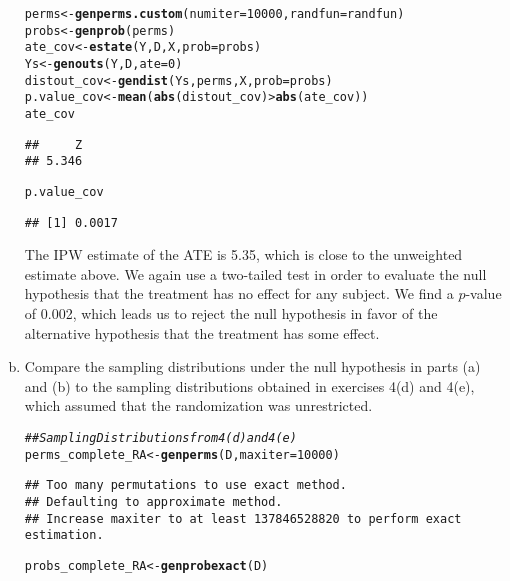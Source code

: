 \documentclass[11pt,notitlepage]{article}\usepackage[]{graphicx}\usepackage[]{color}
\makeatletter
\newcommand{\hlnum}[1]{\textcolor[rgb]{0.686,0.059,0.569}{#1}}%
\newcommand{\hlcom}[1]{\textcolor[rgb]{0.678,0.584,0.686}{\textit{#1}}}%
\newcommand{\hlopt}[1]{\textcolor[rgb]{0,0,0}{#1}}%
\newcommand{\hlstd}[1]{\textcolor[rgb]{0.345,0.345,0.345}{#1}}%
\newcommand{\hlkwb}[1]{\textcolor[rgb]{0.69,0.353,0.396}{#1}}%
\newcommand{\hlkwc}[1]{\textcolor[rgb]{0.333,0.667,0.333}{#1}}%
\newcommand{\hlkwd}[1]{\textcolor[rgb]{0.737,0.353,0.396}{\textbf{#1}}}%
\newenvironment{kframe}{%
 \def\at@end@of@kframe{}%
 \ifinner\ifhmode%
  \def\at@end@of@kframe{\end{minipage}}%
  \begin{minipage}{\columnwidth}%
 \fi\fi%
 \def\FrameCommand##1{\hskip\@totalleftmargin \hskip-\fboxsep
 \colorbox{shadecolor}{##1}\hskip-\fboxsep
     \hskip-\linewidth \hskip-\@totalleftmargin \hskip\columnwidth}%
 \MakeFramed {\advance\hsize-\width
   \@totalleftmargin\z@ \linewidth\hsize
   \@setminipage}}%
 {\par\unskip\endMakeFramed%
 \at@end@of@kframe}
\newenvironment{knitrout}{}{} %
\makeatother
\begin{document}
\begin{enumerate}[a)]
\begin{knitrout}
\color{fgcolor}\begin{kframe}
\begin{alltt}
\hlstd{perms} \hlkwb{<-} \hlkwd{genperms.custom}\hlstd{(}\hlkwc{numiter}\hlstd{=}\hlnum{10000}\hlstd{,}\hlkwc{randfun}\hlstd{=randfun)}
\hlstd{probs} \hlkwb{<-} \hlkwd{genprob}\hlstd{(perms)}
\hlstd{ate_cov} \hlkwb{<-} \hlkwd{estate}\hlstd{(Y,D,X,}\hlkwc{prob}\hlstd{=probs)}
\hlstd{Ys} \hlkwb{<-} \hlkwd{genouts}\hlstd{(Y,D,}\hlkwc{ate}\hlstd{=}\hlnum{0}\hlstd{)}
\hlstd{distout_cov} \hlkwb{<-} \hlkwd{gendist}\hlstd{(Ys,perms,X,}\hlkwc{prob}\hlstd{=probs)}
\hlstd{p.value_cov} \hlkwb{<-} \hlkwd{mean}\hlstd{(}\hlkwd{abs}\hlstd{(distout_cov)} \hlopt{>} \hlkwd{abs}\hlstd{(ate_cov))}
\hlstd{ate_cov}
\end{alltt}
\begin{verbatim}
##     Z 
## 5.346
\end{verbatim}
\begin{alltt}
\hlstd{p.value_cov}
\end{alltt}
\begin{verbatim}
## [1] 0.0017
\end{verbatim}
\end{kframe}
\end{knitrout}

The IPW estimate of the ATE is 5.35, which is close to the unweighted estimate above. We again use a two-tailed test in order to evaluate the null hypothesis that the treatment has no effect for any subject. We find a $p$-value of 0.002, which leads us to reject the null hypothesis in favor of the alternative hypothesis that the treatment has some effect.

\item Compare the sampling distributions under the null hypothesis in parts (a) and (b) to the sampling distributions obtained in exercises 4(d) and 4(e), which assumed that the randomization was unrestricted.  

\begin{knitrout}
\color{fgcolor}\begin{kframe}
\begin{alltt}
\hlcom{## Sampling Distributions from 4(d) and 4(e)}
\hlstd{perms_complete_RA} \hlkwb{<-} \hlkwd{genperms}\hlstd{(D,}\hlkwc{maxiter}\hlstd{=}\hlnum{10000}\hlstd{)}
\end{alltt}
\begin{verbatim}
## Too many permutations to use exact method.
## Defaulting to approximate method.
## Increase maxiter to at least 137846528820 to perform exact estimation.
\end{verbatim}
\begin{alltt}
\hlstd{probs_complete_RA} \hlkwb{<-} \hlkwd{genprobexact}\hlstd{(D)}


\end{alltt}
\end{kframe}
\end{knitrout}
\end{enumerate}
\end{document}
